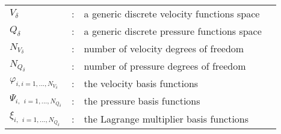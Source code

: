 \begin{longtable}{lcp{}l}
  $V_\delta$ & : & a generic discrete velocity functions space & \\
  $Q_\delta$ & : & a generic discrete pressure functions space & \\
  $N_{V_\delta}$ & : & number of velocity degrees of freedom  &\\
  $N_{Q_\delta}$ & : & number of pressure degrees of freedom  &\\
  $\varphi_{i, i=1, ..., N_{V_\delta} }$ & : & the velocity basis functions & \\
  $\Psi_{i, \ \ i=1, ..., N_{Q_\delta}}$ & : & the pressure basis functions & \\
  $\xi_{i, \ \ i=1, ..., N_{Q_\delta}}$ & : & the Lagrange multiplier basis functions & \\
\end{longtable}

